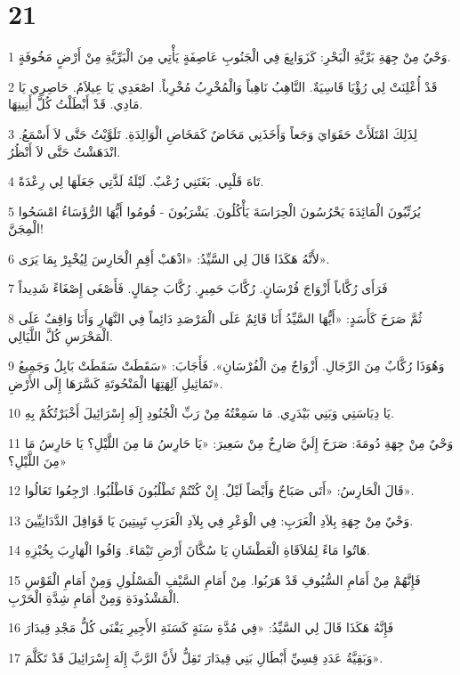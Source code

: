 \chapter{21}

\par 1 وَحْيٌ مِنْ جِهَةِ بَرِّيَّةِ الْبَحْرِ: كَزَوَابِعَ فِي الْجَنُوبِ عَاصِفَةٍ يَأْتِي مِنَ الْبَرِّيَّةِ مِنْ أَرْضٍ مَخُوفَةٍ.
\par 2 قَدْ أُعْلِنَتْ لِي رُؤْيَا قَاسِيَةٌ. النَّاهِبُ نَاهِباً وَالْمُخْرِبُ مُخْرِباً. اصْعَدِي يَا عِيلاَمُ. حَاصِرِي يَا مَادِي. قَدْ أَبْطَلْتُ كُلَّ أَنِينِهَا.
\par 3 لِذَلِكَ امْتَلَأَتْ حَقَوَايَ وَجَعاً وَأَخَذَنِي مَخَاضٌ كَمَخَاضِ الْوَالِدَةِ. تَلَوَّيْتُ حَتَّى لاَ أَسْمَعُ. انْدَهَشْتُ حَتَّى لاَ أَنْظُرُ.
\par 4 تَاهَ قَلْبِي. بَغَتَنِي رُعْبٌ. لَيْلَةُ لَذَّتِي جَعَلَهَا لِي رِعْدَةً.
\par 5 يُرَتِّبُونَ الْمَائِدَةَ يَحْرُسُونَ الْحِرَاسَةَ يَأْكُلُونَ. يَشْرَبُونَ - قُومُوا أَيُّهَا الرُّؤَسَاءُ امْسَحُوا الْمِجَنَّ!
\par 6 لأَنَّهُ هَكَذَا قَالَ لِي السَّيِّدُ: «اذْهَبْ أَقِمِ الْحَارِسَ لِيُخْبِرْ بِمَا يَرَى».
\par 7 فَرَأَى رُكَّاباً أَزْوَاجَ فُرْسَانٍ. رُكَّابَ حَمِيرٍ. رُكَّابَ جِمَالٍ. فَأَصْغَى إِصْغَاءً شَدِيداً
\par 8 ثُمَّ صَرَخَ كَأَسَدٍ: «أَيُّهَا السَّيِّدُ أَنَا قَائِمٌ عَلَى الْمَرْصَدِ دَائِماً فِي النَّهَارِ وَأَنَا وَاقِفٌ عَلَى الْمَحْرَسِ كُلَّ اللَّيَالِي.
\par 9 وَهُوَذَا رُكَّابٌ مِنَ الرِّجَالِ. أَزْوَاجٌ مِنَ الْفُرْسَانِ». فَأَجَابَ: «سَقَطَتْ سَقَطَتْ بَابِلُ وَجَمِيعُ تَمَاثِيلِ آلِهَتِهَا الْمَنْحُوتَةِ كَسَّرَهَا إِلَى الأَرْضِ».
\par 10 يَا دِيَاسَتِي وَبَنِي بَيْدَرِي. مَا سَمِعْتُهُ مِنْ رَبِّ الْجُنُودِ إِلَهِ إِسْرَائِيلَ أَخْبَرْتُكُمْ بِهِ.
\par 11 وَحْيٌ مِنْ جِهَةِ دُومَةَ: صَرَخَ إِلَيَّ صَارِخٌ مِنْ سَعِيرَ: «يَا حَارِسُ مَا مِنَ اللَّيْلِ؟ يَا حَارِسُ مَا مِنَ اللَّيْلِ؟»
\par 12 قَالَ الْحَارِسُ: «أَتَى صَبَاحٌ وَأَيْضاً لَيْلٌ. إِنْ كُنْتُمْ تَطْلُبُونَ فَاطْلُبُوا. ارْجِعُوا تَعَالُوا».
\par 13 وَحْيٌ مِنْ جِهَةِ بِلاَدِ الْعَرَبِ: فِي الْوَعْرِ فِي بِلاَدِ الْعَرَبِ تَبِيتِينَ يَا قَوَافِلَ الدَّدَانِيِّينَ.
\par 14 هَاتُوا مَاءً لِمُلاَقَاةِ الْعَطْشَانِ يَا سُكَّانَ أَرْضِ تَيْمَاءَ. وَافُوا الْهَارِبَ بِخُبْزِهِ.
\par 15 فَإِنَّهُمْ مِنْ أَمَامِ السُّيُوفِ قَدْ هَرَبُوا. مِنْ أَمَامِ السَّيْفِ الْمَسْلُولِ وَمِنْ أَمَامِ الْقَوْسِ الْمَشْدُودَةِ وَمِنْ أَمَامِ شِدَّةِ الْحَرْبِ.
\par 16 فَإِنَّهُ هَكَذَا قَالَ لِي السَّيِّدُ: «فِي مُدَّةِ سَنَةٍ كَسَنَةِ الأَجِيرِ يَفْنَى كُلُّ مَجْدِ قِيدَارَ
\par 17 وَبَقِيَّةُ عَدَدِ قِسِيِّ أَبْطَالِ بَنِي قِيدَارَ تَقِلُّ لأَنَّ الرَّبَّ إِلَهَ إِسْرَائِيلَ قَدْ تَكَلَّمَ».

